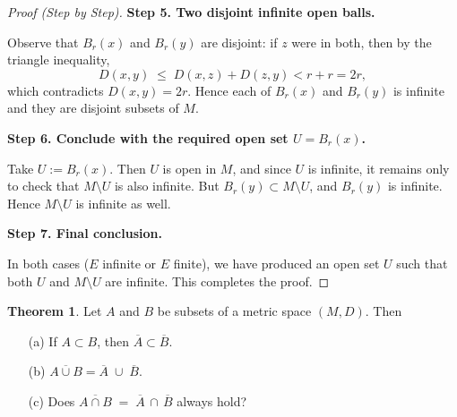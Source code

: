 \documentclass[12pt]{article}
\theoremstyle{definition} %
\newtheorem{theorem}{Theorem}
\theoremstyle{plain} %
\begin{document}
\begin{proof}[Proof (Step by Step)]
                \medskip
                
                \textbf{Step 5. Two disjoint infinite open balls.}
                
                Observe that $B_r(x)$ and $B_r(y)$ are disjoint: if $z$ were in both, then by the triangle inequality,
                \[
                D(x,y) \; \le \; D(x,z) + D(z,y) < r + r = 2r,
                \]
                which contradicts $D(x,y) = 2r$.  
                Hence each of $B_r(x)$ and $B_r(y)$ is infinite and they are disjoint subsets of $M$.
                
                \medskip
                
                \textbf{Step 6. Conclude with the required open set $U = B_r(x)$.}
                
                Take $U := B_r(x)$.  Then $U$ is open in $M$, and since $U$ is infinite, it remains only to check that $M \setminus U$ is also infinite.  But $B_r(y)\subset M \setminus U$, and $B_r(y)$ is infinite.  
                Hence $M \setminus U$ is infinite as well.
                
                \medskip
                
                \textbf{Step 7. Final conclusion.}
                
                In both cases ($E$ infinite or $E$ finite), we have produced an open set $U$ such that both $U$ and $M \setminus U$ are infinite.  This completes the proof.
                \end{proof}
                \begin{theorem}
                    Let $A$ and $B$ be subsets of a metric space $(M,D)$.  Then
                    \begin{itemize}
                    \item[(a)] If $A \subset B$, then $\overline{A} \subset \overline{B}$.
                    \item[(b)] $\overline{A \cup B} = \overline{A} \;\cup\; \overline{B}$.
                    \item[(c)] Does $\overline{A \cap B} \;=\; \overline{A}\,\cap\,\overline{B}$ always hold?
                    \end{itemize}
                    \end{theorem}
                    
\end{document}
